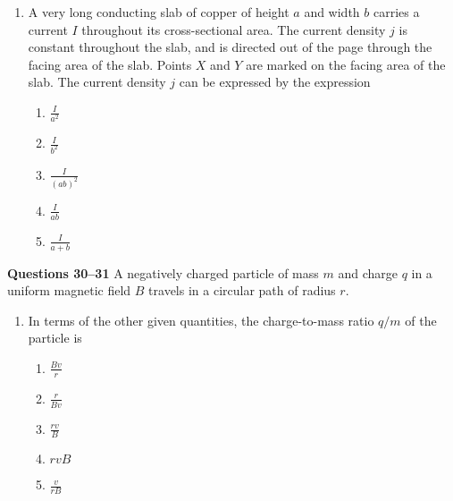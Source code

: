 \documentclass{../../oss-apphys}
\begin{document}
\begin{multicols}{2}
\begin{enumerate}[leftmargin=18pt,resume]
  \item A very long conducting slab of copper of height $a$ and width $b$
    carries a current $I$ throughout its cross-sectional area. The current
    density $j$ is constant throughout the slab, and is directed out of the
    page through the facing area of the slab. Points $X$ and $Y$ are marked on
    the facing area of the slab. The current density $j$ can be expressed by
    the expression
    \begin{center}
    \end{center}
    \begin{enumerate}[noitemsep,topsep=0pt,leftmargin=18pt,label=(\Alph*)]
    \item $\displaystyle\frac{I}{a^2}$
    \item $\displaystyle\frac{I}{b^2}$
    \item $\displaystyle\frac{I}{(ab)^2}$
    \item $\displaystyle\frac{I}{ab}$
    \item $\displaystyle\frac{I}{a+b}$
    \end{enumerate}
  \end{enumerate}

  \columnbreak
  
  \textbf{Questions 30--31}
  A negatively charged particle of mass $m$ and charge $q$ in a uniform magnetic
  field $B$ travels in a circular path of radius $r$.
  \begin{center}
  \end{center}
  \begin{enumerate}[leftmargin=18pt,resume]
  \item In terms of the other given quantities, the charge-to-mass ratio $q/m$
    of the particle is
    \begin{enumerate}[noitemsep,topsep=0pt,leftmargin=18pt,label=(\Alph*)]
    \item $\displaystyle\frac{Bv}{r}$
    \item $\displaystyle\frac{r}{Bv}$
    \item $\displaystyle\frac{rv}{B}$
    \item $rvB$
    \item $\displaystyle\frac{v}{rB}$
    \end{enumerate}


\end{enumerate}
\end{multicols}
\end{document}
